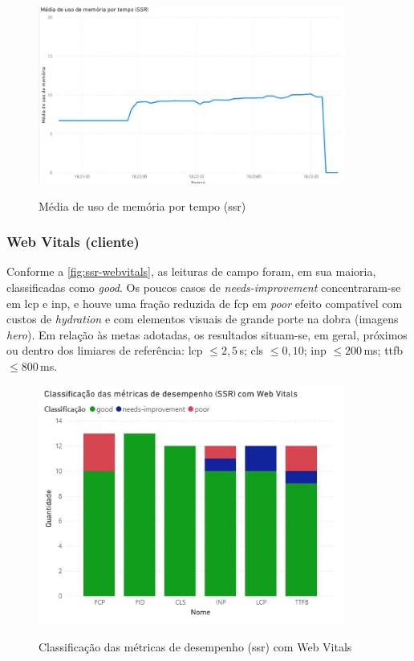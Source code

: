 \begin{figure}[H]
    \centering
    \caption{Média de uso de memória por tempo (\acrshort{ssr})}
    \includegraphics[width=0.9\textwidth]{media/uso_memoria_ssr.jpeg}
    \label{fig:ssr-mem}
\end{figure}

\subsubsection*{Web Vitals (cliente)}
Conforme a \autoref{fig:ssr-webvitals}, as leituras de campo foram, em sua maioria, classificadas como \textit{good}. Os poucos casos de \textit{needs-improvement} concentraram-se em \acrshort{lcp} e \acrshort{inp}, e houve uma fração reduzida de \acrshort{fcp} em \textit{poor} efeito compatível com custos de \textit{hydration} e com elementos visuais de grande porte na dobra (imagens \emph{hero}). Em relação às metas adotadas, os resultados situam-se, em geral, próximos ou dentro dos limiares de referência: \acrshort{lcp} $\leq 2{,}5$\,s; \acrshort{cls} $\leq 0{,}10$; \acrshort{inp} $\leq 200$\,ms; \acrshort{ttfb} $\leq 800$\,ms.

\begin{figure}[H]
    \centering
    \caption{Classificação das métricas de desempenho (\acrshort{ssr}) com Web Vitals}
    \includegraphics[width=0.9\textwidth]{media/metricas_ssr_web_vitals.jpeg}
    \label{fig:ssr-webvitals}
\end{figure}

